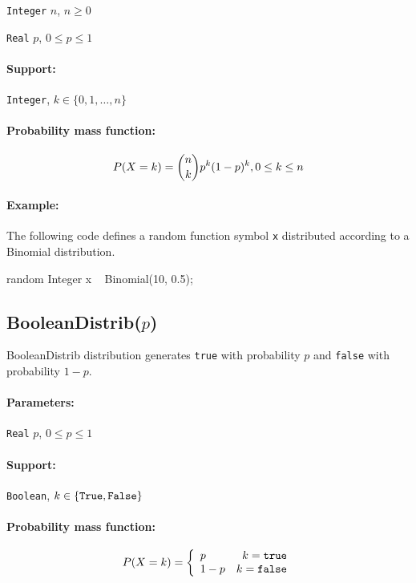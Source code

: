 \begin{itemize*}
\item[] \verb|Integer| $n$, $n \geq 0$
\item[] \verb|Real| $p$, $0 \leq p \leq 1$
\end{itemize*}

\paragraph*{Support:} \verb|Integer|, $k \in \{0, 1, \ldots, n\} $

\paragraph*{Probability mass function:}
\[
	P(X = k) = \binom{n}{k}p^{k}(1-p)^{k} , 0 \leq k \leq n \\
\]

\paragraph*{Example:}
The following code defines a random function symbol \verb|x| distributed according to a Binomial distribution.
\begin{blogcode}
random Integer x ~ Binomial(10, 0.5);
\end{blogcode}

\subsection{BooleanDistrib($p$)}
BooleanDistrib distribution generates \verb|true| with probability $p$ and \verb|false| with probability $1-p$. 

\paragraph*{Parameters:} 
\begin{itemize*}
\item[] \verb|Real|
 $p$, $0 \leq p \leq 1$ 
\end{itemize*}
\paragraph*{Support:} \verb|Boolean|, $k \in \{\verb|True|, \verb|False|\}$ 

\paragraph*{Probability mass function:}
\[
	P(X = k) = \left\{
	  \begin{array}{lr}
	    p & k = \verb|true| \\
	    1 - p & k = \verb|false|
	  \end{array}
	\right.
\]

